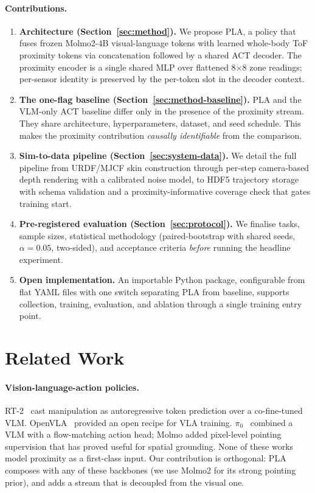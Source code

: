 \documentclass[11pt]{article}
\begin{document}
\paragraph{Contributions.}
\begin{enumerate}[leftmargin=1.5em,topsep=0.2em,itemsep=0.2em]
\item \textbf{Architecture (Section~\ref{sec:method}).} We propose PLA, a
  policy that fuses frozen Molmo2-4B visual-language tokens with learned
  whole-body ToF proximity tokens via concatenation followed by a shared
  ACT decoder. The proximity encoder is a single shared MLP over
  flattened 8$\times$8 zone readings; per-sensor identity is preserved by
  the per-token slot in the decoder context.
\item \textbf{The one-flag baseline (Section~\ref{sec:method-baseline}).}
  PLA and the VLM-only ACT baseline differ only in the presence of the
  proximity stream. They share architecture, hyperparameters, dataset,
  and seed schedule. This makes the proximity contribution
  \emph{causally identifiable} from the comparison.
\item \textbf{Sim-to-data pipeline (Section~\ref{sec:system-data}).} We
  detail the full pipeline from URDF/MJCF skin construction through
  per-step camera-based depth rendering with a calibrated noise model, to
  HDF5 trajectory storage with schema validation and a
  proximity-informative coverage check that gates training start.
\item \textbf{Pre-registered evaluation (Section~\ref{sec:protocol}).} We
  finalise tasks, sample sizes, statistical methodology
  (paired-bootstrap with shared seeds, $\alpha = 0.05$, two-sided), and
  acceptance criteria \emph{before} running the headline experiment.
\item \textbf{Open implementation.} An importable Python package,
  configurable from flat YAML files with one switch separating PLA from
  baseline, supports collection, training, evaluation, and ablation
  through a single training entry point.
\end{enumerate}

\section{Related Work}
\label{sec:related}

\paragraph{Vision-language-action policies.}
RT-2~\citep{brohan2023rt2} cast manipulation as autoregressive token
prediction over a co-fine-tuned VLM. OpenVLA~\citep{kim2024openvla}
provided an open recipe for VLA training. $\pi_0$~\citep{black2024pi0}
combined a VLM with a flow-matching action head; Molmo
\citep{molmo2024} added pixel-level pointing supervision that has proved
useful for spatial grounding. None of these works model proximity as a
first-class input. Our contribution is orthogonal: PLA composes with any
of these backbones (we use Molmo2 for its strong pointing prior), and
adds a stream that is decoupled from the visual one.
\end{document}
